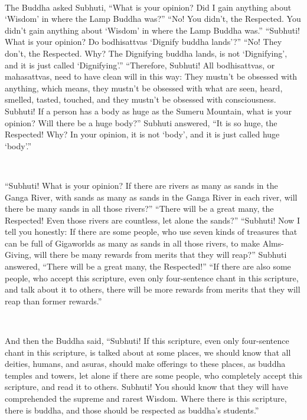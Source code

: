 \documentclass[a5paper,12pt]{book}
\begin{document}
    ~

     The Buddha asked Subhuti, ``What is your opinion? Did I gain anything about `Wisdom' in where the Lamp Buddha was?'' ``No! You didn't, the Respected. You didn't gain anything about `Wisdom' in where the Lamp Buddha was.'' ``Subhuti! What is your opinion? Do bodhisattvas `Dignify buddha lands'?'' ``No! They don't, the Respected. Why? The Dignifying buddha lands, is not `Dignifying', and it is just called `Dignifying'.'' ``Therefore, Subhuti! All bodhisattvas, or mahasattvas, need to have clean will in this way: They mustn't be obsessed with anything, which means, they mustn't be obsessed with what are seen, heard, smelled, tasted, touched, and they mustn't be obsessed with consciousness. Subhuti! If a person has a body as huge as the Sumeru Mountain, what is your opinion? Will there be a huge body?'' Subhuti answered, ``It is so huge, the Respected! Why? In your opinion, it is not `body', and it is just called huge `body'.''

    ~

     ``Subhuti! What is your opinion? If there are rivers as many as sands in the Ganga River, with sands as many as sands in the Ganga River in each river, will there be many sands in all those rivers?'' ``There will be a great many, the Respected! Even those rivers are countless, let alone the sands?'' ``Subhuti! Now I tell you honestly: If there are some people, who use seven kinds of treasures that can be full of Gigaworlds as many as sands in all those rivers, to make Alms-Giving, will there be many rewards from merits that they will reap?'' Subhuti answered, ``There will be a great many, the Respected!'' ``If there are also some people, who accept this scripture, even only four-sentence chant in this scripture, and talk about it to others, there will be more rewards from merits that they will reap than former rewards.''

    ~

     And then the Buddha said, ``Subhuti! If this scripture, even only four-sentence chant in this scripture, is talked about at some places, we should know that all deities, humans, and asuras, should make offerings to these places, as buddha temples and towers, let alone if there are some people, who completely accept this scripture, and read it to others. Subhuti! You should know that they will have comprehended the supreme and rarest Wisdom. Where there is this scripture, there is buddha, and those should be respected as buddha's students.''
\end{document}

